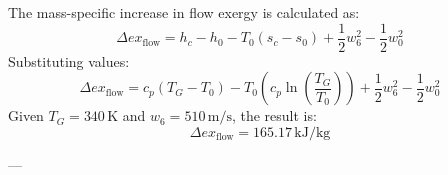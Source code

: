 The mass-specific increase in flow exergy is calculated as:  
\[
\Delta ex_{\text{flow}} = h_c - h_0 - T_0 (s_c - s_0) + \frac{1}{2} w_6^2 - \frac{1}{2} w_0^2
\]  
Substituting values:  
\[
\Delta ex_{\text{flow}} = c_p (T_G - T_0) - T_0 \left( c_p \ln \left( \frac{T_G}{T_0} \right) \right) + \frac{1}{2} w_6^2 - \frac{1}{2} w_0^2
\]  
Given \( T_G = 340 \, \text{K} \) and \( w_6 = 510 \, \text{m/s} \), the result is:  
\[
\Delta ex_{\text{flow}} = 165.17 \, \text{kJ/kg}
\]  

---